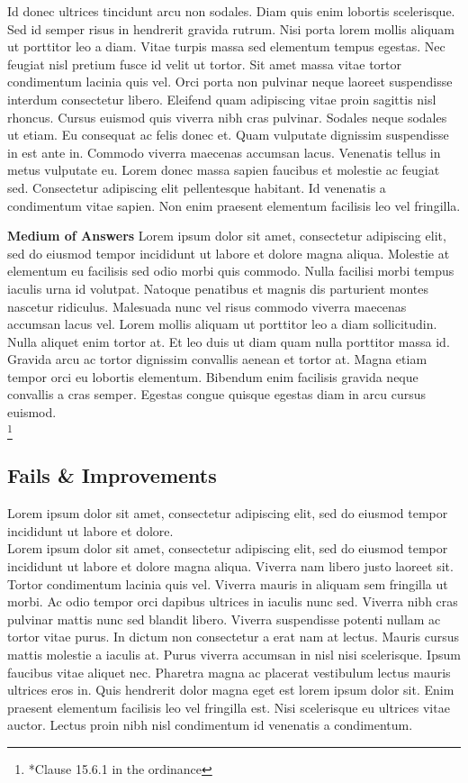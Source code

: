 \documentclass{article}
\begin{document}
Id donec ultrices tincidunt arcu non sodales. Diam quis enim lobortis scelerisque. Sed id semper risus in hendrerit gravida rutrum. Nisi porta lorem mollis aliquam ut porttitor leo a diam. Vitae turpis massa sed elementum tempus egestas. Nec feugiat nisl pretium fusce id velit ut tortor. Sit amet massa vitae tortor condimentum lacinia quis vel. Orci porta non pulvinar neque laoreet suspendisse interdum consectetur libero. Eleifend quam adipiscing vitae proin sagittis nisl rhoncus. Cursus euismod quis viverra nibh cras pulvinar. Sodales neque sodales ut etiam. Eu consequat ac felis donec et. Quam vulputate dignissim suspendisse in est ante in. Commodo viverra maecenas accumsan lacus. Venenatis tellus in metus vulputate eu. Lorem donec massa sapien faucibus et molestie ac feugiat sed. Consectetur adipiscing elit pellentesque habitant. Id venenatis a condimentum vitae sapien. Non enim praesent elementum facilisis leo vel fringilla. \\

\vspace{5mm}

\textbf{Medium of Answers} Lorem ipsum dolor sit amet, consectetur adipiscing elit, sed do eiusmod tempor incididunt ut labore et dolore magna aliqua. Molestie at elementum eu facilisis sed odio morbi quis commodo. Nulla facilisi morbi tempus iaculis urna id volutpat. Natoque penatibus et magnis dis parturient montes nascetur ridiculus. Malesuada nunc vel risus commodo viverra maecenas accumsan lacus vel. Lorem mollis aliquam ut porttitor leo a diam sollicitudin. Nulla aliquet enim tortor at. Et leo duis ut diam quam nulla porttitor massa id. Gravida arcu ac tortor dignissim convallis aenean et tortor at. Magna etiam tempor orci eu lobortis elementum. Bibendum enim facilisis gravida neque convallis a cras semper. Egestas congue quisque egestas diam in arcu cursus euismod.\\
\footnote{*Clause 15.6.1 in the ordinance}
\pagebreak
\subsection{Fails \& Improvements}
Lorem ipsum dolor sit amet, consectetur adipiscing elit, sed do eiusmod tempor incididunt ut labore et dolore.\\
Lorem ipsum dolor sit amet, consectetur adipiscing elit, sed do eiusmod tempor incididunt ut labore et dolore magna aliqua. Viverra nam libero justo laoreet sit. Tortor condimentum lacinia quis vel. Viverra mauris in aliquam sem fringilla ut morbi. Ac odio tempor orci dapibus ultrices in iaculis nunc sed. Viverra nibh cras pulvinar mattis nunc sed blandit libero. Viverra suspendisse potenti nullam ac tortor vitae purus. In dictum non consectetur a erat nam at lectus. Mauris cursus mattis molestie a iaculis at. Purus viverra accumsan in nisl nisi scelerisque. Ipsum faucibus vitae aliquet nec. Pharetra magna ac placerat vestibulum lectus mauris ultrices eros in. Quis hendrerit dolor magna eget est lorem ipsum dolor sit. Enim praesent elementum facilisis leo vel fringilla est. Nisi scelerisque eu ultrices vitae auctor. Lectus proin nibh nisl condimentum id venenatis a condimentum.\\
\end{document}
